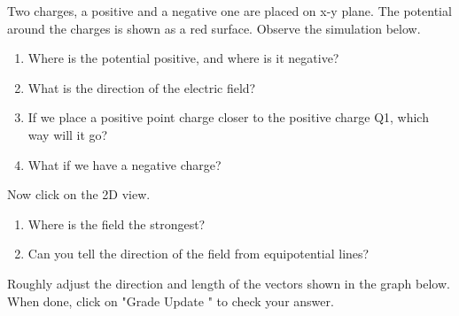 \documentclass{ximera}
\begin{document}
\begin{example}
Two charges, a positive and a negative one are placed on x-y plane. The potential around the charges is shown as a red surface. Observe the simulation below. 

\begin{enumerate}
\item Where is the potential positive, and where is it negative? 
\item What is the direction of the electric field? 
\item If we place a positive point charge closer to the positive charge Q1, which way will it go?
\item What if we have a negative charge?
\end{enumerate}
Now click on the 2D view.
\begin{enumerate}
\item Where is the field the strongest? 
\item Can you tell the direction of the field from equipotential lines?
\end{enumerate}

\begin{center}  
\end{center} 

\end{example}


\begin{problem}
Roughly adjust the direction and length of the vectors shown in the graph below. When done, click on "Grade Update " to check your answer.

\begin{center}  
\end{center} 

\end{problem}
\end{document}

